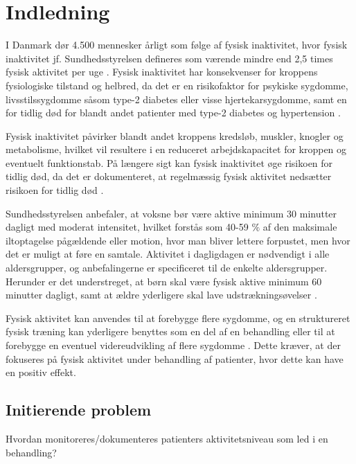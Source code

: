\chapter{Indledning} \label{sec:indledning}
I Danmark dør 4.500 mennesker årligt som følge af fysisk inaktivitet, hvor fysisk inaktivitet jf. Sundhedsstyrelsen defineres som værende mindre end 2,5 times fysisk aktivitet per uge \citep{aagaard2014}. Fysisk inaktivitet har konsekvenser for kroppens fysiologiske tilstand og helbred, da det er en risikofaktor for psykiske sygdomme, livsstilssygdomme såsom type-2 diabetes eller visse hjertekarsygdomme, samt en for tidlig død for blandt andet patienter med type-2 diabetes og hypertension \citep{motionsraad2007}. 

Fysisk inaktivitet påvirker blandt andet kroppens kredsløb, muskler, knogler og metabolisme, hvilket vil resultere i en reduceret arbejdskapacitet for kroppen og eventuelt funktionstab. På længere sigt kan fysisk inaktivitet øge risikoen for tidlig død, da det er dokumenteret, at regelmæssig fysisk aktivitet nedsætter risikoen for tidlig død \citep{motionsraad2007}.

Sundhedsstyrelsen anbefaler, at voksne bør være aktive minimum 30 minutter dagligt med moderat intensitet, hvilket forstås som 40-59 $\%$ af den maksimale iltoptagelse pågældende eller motion, hvor man bliver lettere forpustet, men hvor det er muligt at føre en samtale.
Aktivitet i dagligdagen er nødvendigt i alle aldersgrupper, og anbefalingerne er specificeret til de enkelte aldersgrupper. Herunder er det understreget, at børn skal være fysisk aktive minimum 60 minutter dagligt, samt at ældre yderligere skal lave udstrækningsøvelser \citep{pedersen2011}.

Fysisk aktivitet kan anvendes til at forebygge flere sygdomme, og en struktureret fysisk træning kan yderligere benyttes som en del af en behandling eller til at forebygge en eventuel videreudvikling af flere sygdomme \citep{motionsraad2007}. Dette kræver, at der fokuseres på fysisk aktivitet under behandling af patienter, hvor dette kan have en positiv effekt.



\section{Initierende problem}
Hvordan monitoreres/dokumenteres patienters aktivitetsniveau som led i en behandling?  

